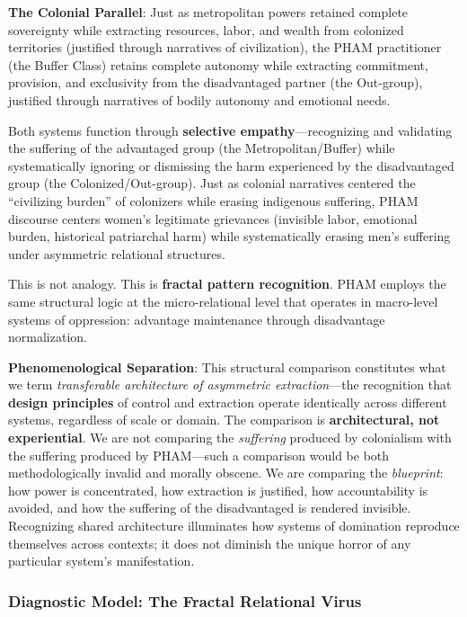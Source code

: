 \documentclass[12pt, letterpaper]{article}
\begin{document}
\textbf{The Colonial Parallel}: Just as metropolitan powers retained complete sovereignty while extracting resources, labor, and wealth from colonized territories (justified through narratives of civilization), the PHAM practitioner (the Buffer Class) retains complete autonomy while extracting commitment, provision, and exclusivity from the disadvantaged partner (the Out-group), justified through narratives of bodily autonomy and emotional needs.

Both systems function through \textbf{selective empathy}---recognizing and validating the suffering of the advantaged group (the Metropolitan/Buffer) while systematically ignoring or dismissing the harm experienced by the disadvantaged group (the Colonized/Out-group). Just as colonial narratives centered the ``civilizing burden'' of colonizers while erasing indigenous suffering, PHAM discourse centers women's legitimate grievances (invisible labor, emotional burden, historical patriarchal harm) while systematically erasing men's suffering under asymmetric relational structures.

This is not analogy. This is \textbf{fractal pattern recognition}. PHAM employs the same structural logic at the micro-relational level that operates in macro-level systems of oppression: advantage maintenance through disadvantage normalization.

\textbf{Phenomenological Separation}: This structural comparison constitutes what we term \textit{transferable architecture of asymmetric extraction}---the recognition that \textbf{design principles} of control and extraction operate identically across different systems, regardless of scale or domain. The comparison is \textbf{architectural, not experiential}. We are not comparing the \textit{suffering} produced by colonialism with the suffering produced by PHAM---such a comparison would be both methodologically invalid and morally obscene. We are comparing the \textit{blueprint}: how power is concentrated, how extraction is justified, how accountability is avoided, and how the suffering of the disadvantaged is rendered invisible. Recognizing shared architecture illuminates how systems of domination reproduce themselves across contexts; it does not diminish the unique horror of any particular system's manifestation.

\subsubsection{Diagnostic Model: The Fractal Relational Virus}
\end{document}
